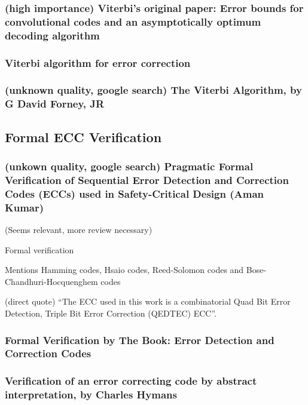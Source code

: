 \documentclass{article}
\begin{document}
\subsubsection{(high importance) Viterbi's original paper: Error bounds for convolutional codes and an asymptotically optimum decoding algorithm }

\subsubsection{Viterbi algorithm for error correction}

\subsubsection{(unknown quality, google search) The Viterbi Algorithm, by G David Forney, JR}


\subsection{Formal ECC Verification}

\subsubsection{(unkown quality, google search) Pragmatic Formal Verification of Sequential Error
Detection and Correction Codes (ECCs) used in
Safety-Critical Design (Aman Kumar)}

(Seems relevant, more review necessary)

Formal verification

Mentions Hamming codes, Hsaio codes, Reed-Solomon codes and Bose-Chandhuri-Hocquenghem codes

(direct quote) ``The ECC used in this work is a combinatorial Quad Bit Error Detection, Triple Bit Error Correction (QEDTEC) ECC''.

\subsubsection{Formal Verification by The Book: Error Detection and Correction Codes}

\subsubsection{Verification of an error correcting code by abstract interpretation, by Charles Hymans}
\end{document}
